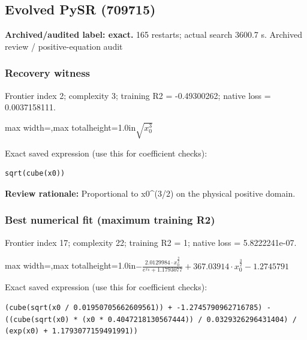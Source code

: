 \documentclass[10pt,letterpaper,landscape]{article}
\begin{document}
\begin{minipage}[t]{0.485\textwidth}
\subsection*{Evolved PySR (709715)}
\textbf{Archived/audited label: exact.} 165 restarts; actual search 3600.7 s.
{\small Archived review / positive-equation audit}
\subsubsection*{Recovery witness}
Frontier index 2; complexity 3; training R2 = -0.49300262; native loss = 0.0037158111.
\begin{center}\begin{adjustbox}{max width=\linewidth,max totalheight=1.0in}$\displaystyle \sqrt{x_{0}^{3}}$\end{adjustbox}\end{center}
{\scriptsize Exact saved expression (use this for coefficient checks):}
\begin{lstlisting}
sqrt(cube(x0))
\end{lstlisting}
{\small\textbf{Review rationale:} Proportional to x0\textasciicircum{}(3/2) on the physical positive domain.}
\subsubsection*{Best numerical fit (maximum training R2)}
Frontier index 17; complexity 22; training R2 = 1; native loss = 5.8222241e-07.
\begin{center}\begin{adjustbox}{max width=\linewidth,max totalheight=1.0in}$\displaystyle - \frac{2.0129984 \cdot x_{0}^{\frac{9}{2}}}{e^{x_{0}} + 1.1793077} + 367.03914 \cdot x_{0}^{\frac{3}{2}} - 1.2745791$\end{adjustbox}\end{center}
{\scriptsize Exact saved expression (use this for coefficient checks):}
\begin{lstlisting}
(cube(sqrt(x0 / 0.01950705662609561)) + -1.2745790962716785) - ((cube(sqrt(x0) * (x0 * 0.4047218130567444)) / 0.0329326296431404) / (exp(x0) + 1.1793077159491991))
\end{lstlisting}
\end{minipage}
\clearpage{}\label{leavitt-10000}
\end{document}
